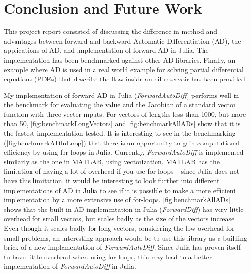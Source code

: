 \chapter{Conclusion and Future Work}
\label{ch:Conclusion}
This project report consisted of discussing the difference in method and advantages between forward and backward Automatic Differentiation (AD), the applications of AD, and implementation of forward AD in Julia. The implementation has been benchmarked against other AD libraries. Finally, an example where AD is used in a real world example for solving partial differential equations (PDEs) that describe the flow inside an oil reservoir has been provided.

My implementation of forward AD in Julia (\textit{ForwardAutoDiff}) performs well in the benchmark for evaluating the value and the Jacobian of a standard vector function with three vector inputs. For vectors of lengths less than 1000, but more than 50, \autoref{fig:benchmarkLongVectors} and \autoref{fig:benchmarkAllADs} show that it is the fastest implementation tested. It is interesting to see in the benchmarking (\autoref{fig:benchmarkADInLoop}) that there is an opportunity to gain computational efficiency by using for-loops in Julia. Currently, \textit{ForwardAutoDiff} is implemented similarly as the one in MATLAB, using vectorization. MATLAB has the limitation of having a lot of overhead if you use for-loops -- since Julia does not have this limitation, it would be interesting to look further into different implementations of AD in Julia to see if it is possible to make a more efficient implementation by a more extensive use of for-loops. \autoref{fig:benchmarkAllADs} shows that the built-in AD implementation in Julia (\textit{ForwardDiff}) has very little overhead for small vectors, but scales badly as the size of the vectors increase. Even though it scales badly for long vectors, considering the low overhead for small problems, an interesting approach would be to use this library as a building brick of a new implementation of \textit{ForwardAutoDiff}. Since Julia has proven itself to have little overhead when using for-loops, this may lead to a better implementation of \textit{ForwardAutoDiff} in Julia.

